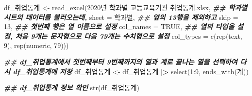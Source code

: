 \documentclass[
]{article}
\newenvironment{Shaded}{\begin{snugshade}}{\end{snugshade}}
\newcommand{\AttributeTok}[1]{\textcolor[rgb]{0.77,0.63,0.00}{#1}}
\newcommand{\ConstantTok}[1]{\textcolor[rgb]{0.00,0.00,0.00}{#1}}
\newcommand{\DecValTok}[1]{\textcolor[rgb]{0.00,0.00,0.81}{#1}}
\newcommand{\DocumentationTok}[1]{\textcolor[rgb]{0.56,0.35,0.01}{\textbf{\textit{#1}}}}
\newcommand{\ErrorTok}[1]{\textcolor[rgb]{0.64,0.00,0.00}{\textbf{#1}}}
\newcommand{\FunctionTok}[1]{\textcolor[rgb]{0.00,0.00,0.00}{#1}}
\newcommand{\NormalTok}[1]{#1}
\newcommand{\OtherTok}[1]{\textcolor[rgb]{0.56,0.35,0.01}{#1}}
\newcommand{\SpecialCharTok}[1]{\textcolor[rgb]{0.00,0.00,0.00}{#1}}
\newcommand{\StringTok}[1]{\textcolor[rgb]{0.31,0.60,0.02}{#1}}
\begin{document}
\begin{Shaded}
\begin{Highlighting}[]
\NormalTok{df\_취업통계 }\OtherTok{\textless{}{-}} \FunctionTok{read\_excel}\NormalTok{(}\StringTok{\textquotesingle{}2020년 학과별 고등교육기관 취업통계.xlsx\textquotesingle{}}\NormalTok{, }
                     \DocumentationTok{\#\# \textquotesingle{}학과별\textquotesingle{} 시트의 데이터를 불러오는데,}
                     \AttributeTok{sheet =} \StringTok{\textquotesingle{}학과별\textquotesingle{}}\NormalTok{,}
                     \DocumentationTok{\#\# 앞의 13행을 제외하고}
                     \AttributeTok{skip =} \DecValTok{13}\NormalTok{, }
                     \DocumentationTok{\#\# 첫번째 행은 열 이름으로 설정}
                     \AttributeTok{col\_names =} \ConstantTok{TRUE}\NormalTok{, }
                     \DocumentationTok{\#\# 열의 타입을 설정, 처음 9개는 문자형으로 다음 79개는 수치형으로 설정}
                     \AttributeTok{col\_types =} \FunctionTok{c}\NormalTok{(}\FunctionTok{rep}\NormalTok{(}\StringTok{\textquotesingle{}text\textquotesingle{}}\NormalTok{, }\DecValTok{9}\NormalTok{), }\FunctionTok{rep}\NormalTok{(}\StringTok{\textquotesingle{}numeric\textquotesingle{}}\NormalTok{, }\DecValTok{79}\NormalTok{)))}

\DocumentationTok{\#\# df\_취업통계에서 첫번째부터 9번째까지의 열과 \textquotesingle{}계\textquotesingle{}로 끝나는 열을 선택하여 다시 df\_취업통계에 저장}
\NormalTok{df\_취업통계 }\OtherTok{\textless{}{-}}\NormalTok{ df\_취업통계 }\SpecialCharTok{|}\ErrorTok{\textgreater{}} \FunctionTok{select}\NormalTok{(}\DecValTok{1}\SpecialCharTok{:}\DecValTok{9}\NormalTok{, }\FunctionTok{ends\_with}\NormalTok{(}\StringTok{\textquotesingle{}계\textquotesingle{}}\NormalTok{))}

\DocumentationTok{\#\# df\_취업통계 정보 확인}
\FunctionTok{str}\NormalTok{(df\_취업통계)}
\end{Highlighting}
\end{Shaded}
\end{document}

